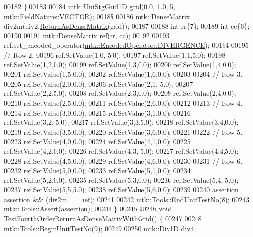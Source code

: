 \begin{DoxyCode}
00182   \}
00183 
00184   \hyperlink{classmtk_1_1UniStgGrid1D}{mtk::UniStgGrid1D} grid(0.0, 1.0, 5, \hyperlink{namespacemtk_ga4c54f2a329cfb4e56213b02a259d19e2a87752381b583740610f1dfeb07fdad7e}{mtk::FieldNature::VECTOR});
00185 
00186   \hyperlink{classmtk_1_1DenseMatrix}{mtk::DenseMatrix} div2m(div2.\hyperlink{classmtk_1_1Div1D_a213fddbaaf86e4840c6a9649b69c2d49}{ReturnAsDenseMatrix}(grid));
00187 
00188   \textcolor{keywordtype}{int} rr\{7\};
00189   \textcolor{keywordtype}{int} cc\{6\};
00190 
00191   \hyperlink{classmtk_1_1DenseMatrix}{mtk::DenseMatrix} ref(rr, cc);
00192 
00193   ref.set\_encoded\_operator(\hyperlink{namespacemtk_ga9b50023bfb2692219d2915feade94f80a4e4e9e6d004c642e33d6f823b57bd60e}{mtk::EncodedOperator::DIVERGENCE});
00194 
00195   \textcolor{comment}{// Row 2.}
00196   ref.SetValue(1,0,-5.0);
00197   ref.SetValue(1,1,5.0);
00198   ref.SetValue(1,2,0.0);
00199   ref.SetValue(1,3,0.0);
00200   ref.SetValue(1,4,0.0);
00201   ref.SetValue(1,5,0.0);
00202   ref.SetValue(1,6,0.0);
00203 
00204   \textcolor{comment}{// Row 3.}
00205   ref.SetValue(2,0,0.0);
00206   ref.SetValue(2,1,-5.0);
00207   ref.SetValue(2,2,5.0);
00208   ref.SetValue(2,3,0.0);
00209   ref.SetValue(2,4,0.0);
00210   ref.SetValue(2,5,0.0);
00211   ref.SetValue(2,6,0.0);
00212 
00213   \textcolor{comment}{// Row 4.}
00214   ref.SetValue(3,0,0.0);
00215   ref.SetValue(3,1,0.0);
00216   ref.SetValue(3,2,-5.0);
00217   ref.SetValue(3,3,5.0);
00218   ref.SetValue(3,4,0.0);
00219   ref.SetValue(3,5,0.0);
00220   ref.SetValue(3,6,0.0);
00221 
00222   \textcolor{comment}{// Row 5.}
00223   ref.SetValue(4,0,0.0);
00224   ref.SetValue(4,1,0.0);
00225   ref.SetValue(4,2,0.0);
00226   ref.SetValue(4,3,-5.0);
00227   ref.SetValue(4,4,5.0);
00228   ref.SetValue(4,5,0.0);
00229   ref.SetValue(4,6,0.0);
00230 
00231   \textcolor{comment}{// Row 6.}
00232   ref.SetValue(5,0,0.0);
00233   ref.SetValue(5,1,0.0);
00234   ref.SetValue(5,2,0.0);
00235   ref.SetValue(5,3,0.0);
00236   ref.SetValue(5,4,-5.0);
00237   ref.SetValue(5,5,5.0);
00238   ref.SetValue(5,6,0.0);
00239 
00240   assertion = assertion && (div2m == ref);
00241 
00242   \hyperlink{classmtk_1_1Tools_aba67d9dc35c9c1c49430fcc9ea035e03}{mtk::Tools::EndUnitTestNo}(8);
00243   \hyperlink{classmtk_1_1Tools_ac6804df469c94ab6a796fb64f1e44a89}{mtk::Tools::Assert}(assertion);
00244 \}
00245 
00246 \textcolor{keywordtype}{void} TestFourthOrderReturnAsDenseMatrixWithGrid() \{
00247 
00248   \hyperlink{classmtk_1_1Tools_afc29ecaf337a13ed2e817d3890a5a441}{mtk::Tools::BeginUnitTestNo}(9);
00249 
00250   \hyperlink{classmtk_1_1Div1D}{mtk::Div1D} div4;

\end{DoxyCode}

